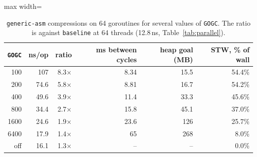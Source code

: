 \begin{table}[htbp]\centering\small
\caption{\texttt{generic-asm} compressions on 64 goroutines for several values of \texttt{GOGC}. The ratio is against \texttt{baseline} at 64 threads (12.8\,ns, Table~\ref{tab:parallel}).}\label{tab:gogc}
\begin{adjustbox}{max width=\linewidth}
\begin{tabular}{r|rrrrr}
\toprule
\texttt{GOGC} & ns/op & ratio & ms between cycles & heap goal (MB) & STW, \% of wall \\ \midrule
100 & 107 & 8.3$\times$ & 8.34 & 15.5 & 54.4\% \\
200 & 74.6 & 5.8$\times$ & 8.81 & 16.7 & 54.2\% \\
400 & 49.6 & 3.9$\times$ & 11.4 & 33.3 & 45.6\% \\
800 & 34.4 & 2.7$\times$ & 15.8 & 45.1 & 37.0\% \\
1600 & 24.6 & 1.9$\times$ & 23.6 & 126 & 25.7\% \\
6400 & 17.9 & 1.4$\times$ & 65 & 268 & 8.0\% \\
off & 16.1 & 1.3$\times$ & -- & -- & 0.0\% \\
\bottomrule
\end{tabular}
\end{adjustbox}
\end{table}
